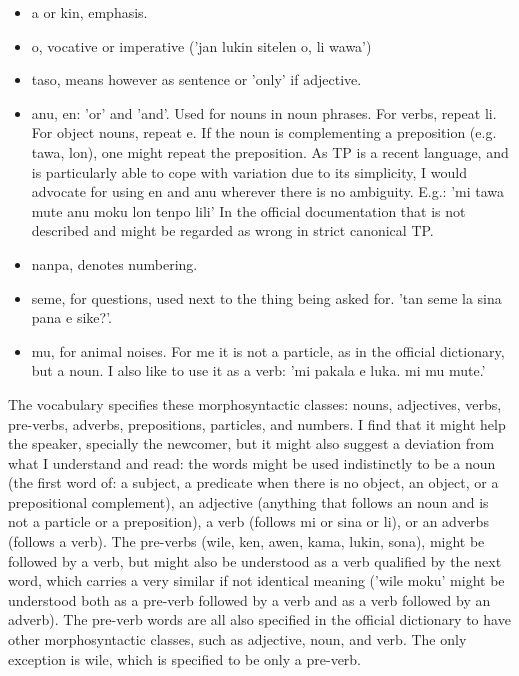 \documentclass{article}
\begin{document}
\begin{itemize}
  \item a or kin, emphasis.
  \item o, vocative or imperative ('jan lukin sitelen o, li wawa')
  \item taso, means however as sentence or 'only' if adjective.
  \item anu, en: 'or' and 'and'. Used for nouns in noun phrases.
    For verbs, repeat li.
    For object nouns, repeat e.
    If the noun is complementing a preposition (e.g. tawa, lon),
    one might repeat the preposition.
    As TP is a recent language, and is particularly able to cope with
    variation due to its simplicity, I would advocate for
    using en and anu wherever there is no ambiguity.
    E.g.: 'mi tawa mute anu moku lon tenpo lili'
    In the official documentation that is not described and
    might be regarded as wrong in strict canonical TP.
  \item nanpa, denotes numbering.
  \item seme, for questions, used next to the thing being asked for.
    'tan seme la sina pana e sike?'.
  \item mu, for animal noises. For me it is not a particle, as in the
    official dictionary, but a noun.
    I also like to use it as a verb:
    'mi pakala e luka. mi mu mute.'
\end{itemize}

The vocabulary specifies these morphosyntactic classes:
nouns, adjectives, verbs, pre-verbs, adverbs, prepositions, particles, and numbers.
I find that it might help the speaker, specially the newcomer, but
it might also suggest a deviation from what I understand and read:
the words might be used indistinctly to be a noun
(the first word of: a subject, a predicate when there is no object, an object,
or a prepositional complement),
an adjective (anything that follows an noun and is not a particle or a
preposition),
a verb (follows mi or sina or li),
or an adverbs (follows a verb).
The pre-verbs (wile, ken, awen, kama, lukin, sona),
might be followed by a verb, but might also be understood
as a verb qualified by the next word,
which carries a very similar if not identical meaning
('wile moku' might be understood both as a pre-verb followed
by a verb and as a verb followed by an adverb).
The pre-verb words are all also specified in the official dictionary
to have other morphosyntactic classes,
such as adjective, noun, and verb.
The only exception is wile, which is specified to be only a pre-verb.
\end{document}
